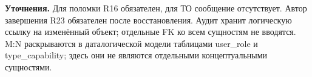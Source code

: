 \documentclass[14pt]{extarticle}
\begin{document}
\vspace{5mm}
\textbf{Уточнения.} Для поломки R16 обязателен, для ТО сообщение отсутствует. Автор завершения R23 обязателен после восстановления.
Аудит хранит логическую ссылку на изменённый объект; отдельные FK ко всем сущностям не вводятся.
M:N раскрываются в даталогической модели таблицами user\_role и type\_capability; здесь они не являются отдельными концептуальными сущностями.
\end{document}
